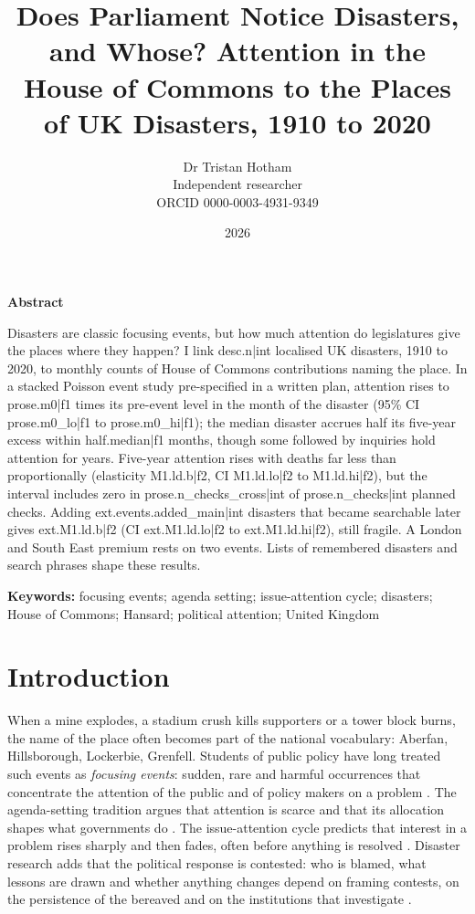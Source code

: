 \documentclass[11pt,a4paper]{article}
\title{\textbf{Does Parliament Notice Disasters, and Whose? Attention in the House of Commons to the Places of UK Disasters, 1910 to 2020}}
\author{Dr Tristan Hotham\\\small Independent researcher\\\small ORCID 0000-0003-4931-9349}
\date{2026}
\begin{document}
\maketitle
\begin{center}\textbf{Abstract}\end{center}
Disasters are classic focusing events, but how much attention do legislatures give the places where they happen? I link {{desc.n|int}} localised UK disasters, 1910 to 2020, to monthly counts of House of Commons contributions naming the place. In a stacked Poisson event study pre-specified in a written plan, attention rises to {{prose.m0|f1}} times its pre-event level in the month of the disaster (95\% CI {{prose.m0_lo|f1}} to {{prose.m0_hi|f1}}); the median disaster accrues half its five-year excess within {{half.median|f1}} months, though some followed by inquiries hold attention for years. Five-year attention rises with deaths far less than proportionally (elasticity {{M1.ld.b|f2}}, CI {{M1.ld.lo|f2}} to {{M1.ld.hi|f2}}), but the interval includes zero in {{prose.n_checks_cross|int}} of {{prose.n_checks|int}} planned checks. Adding {{ext.events.added_main|int}} disasters that became searchable later gives {{ext.M1.ld.b|f2}} (CI {{ext.M1.ld.lo|f2}} to {{ext.M1.ld.hi|f2}}), still fragile. A London and South East premium rests on two events. Lists of remembered disasters and search phrases shape these results.

\medskip\noindent\textbf{Keywords:} focusing events; agenda setting; issue-attention cycle; disasters; House of Commons; Hansard; political attention; United Kingdom

\section{Introduction}
\label{sec:intro}
When a mine explodes, a stadium crush kills supporters or a tower block burns, the name of the place often becomes part of the national vocabulary: Aberfan, Hillsborough, Lockerbie, Grenfell. Students of public policy have long treated such events as \emph{focusing events}: sudden, rare and harmful occurrences that concentrate the attention of the public and of policy makers on a problem \citep{Kingdon1984,Birkland1997,Birkland1998}. The agenda-setting tradition argues that attention is scarce and that its allocation shapes what governments do \citep{BaumgartnerJones1993,JonesBaumgartner2005}. The issue-attention cycle predicts that interest in a problem rises sharply and then fades, often before anything is resolved \citep{Downs1972}. Disaster research adds that the political response is contested: who is blamed, what lessons are drawn and whether anything changes depend on framing contests, on the persistence of the bereaved and on the institutions that investigate \citep{Boin2005,Boin2009,Hood2011,Birkland2006}.
\end{document}
